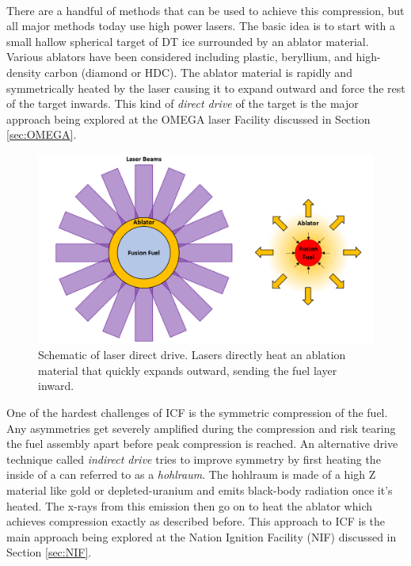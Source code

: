  \\

There are a handful of methods that can be used to achieve this compression, but all major methods today use high power lasers. The basic idea is to start with a small hallow spherical target of DT ice surrounded by an ablator material. Various ablators have been considered including plastic, beryllium, and high-density carbon (diamond or HDC). The ablator material is rapidly and symmetrically heated by the laser causing it to expand outward and force the rest of the target inwards. This kind of \emph{direct drive} of the target is the major approach being explored at the OMEGA laser Facility discussed in Section \ref{sec:OMEGA}. 

\begin{figure}[h!]
	\centering
	\includegraphics[scale=0.5]{Figures/directDrive.pdf}
	\caption[Direct Drive Schematic]{Schematic of laser direct drive. Lasers directly heat an ablation material that quickly expands outward, sending the fuel layer inward.  }
\end{figure}

One of the hardest challenges of ICF is the symmetric compression of the fuel. Any asymmetries get severely amplified during the compression and risk tearing the fuel assembly apart before peak compression is reached. An alternative drive technique called \emph{indirect drive} tries to improve symmetry by first heating the inside of a can referred to as a \emph{hohlraum}. The hohlraum is made of a high Z material like gold or depleted-uranium and emits black-body radiation once it's heated. The x-rays from this emission then go on to heat the ablator which achieves compression exactly as described before. This approach to ICF is the main approach being explored at the Nation Ignition Facility (NIF) discussed in Section \ref{sec:NIF}. 

